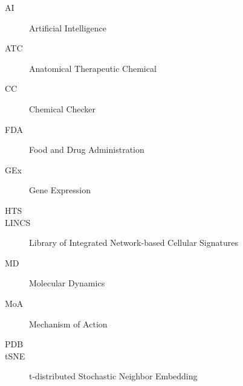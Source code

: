 

\begin{description}
    \item[AI] Artificial Intelligence
    \item[ATC] Anatomical Therapeutic Chemical
    \item[CC] Chemical Checker
    \item[FDA] Food and Drug Administration
    \item[GEx] Gene Expression
    \item[HTS]
    \item[LINCS] Library of Integrated Network-based Cellular Signatures
    \item[MD] Molecular Dynamics
    \item[MoA] Mechanism of Action
    \item[PDB]
    \item[tSNE] t-distributed Stochastic Neighbor Embedding
\end{description}

